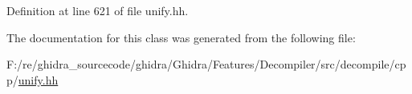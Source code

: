 Definition at line 621 of file unify.\+hh.



The documentation for this class was generated from the following file\+:\begin{DoxyCompactItemize}
\item 
F\+:/re/ghidra\+\_\+sourcecode/ghidra/\+Ghidra/\+Features/\+Decompiler/src/decompile/cpp/\mbox{\hyperlink{unify_8hh}{unify.\+hh}}\end{DoxyCompactItemize}
